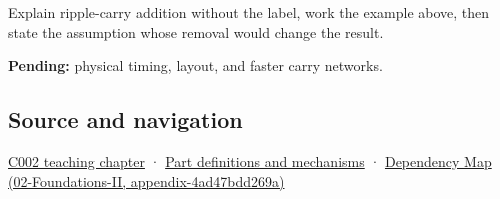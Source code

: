 Explain ripple-carry addition without the label, work the example above, then state the assumption whose removal would change the result.

\textbf{Pending:} physical timing, layout, and faster carry networks.

\subsection{Source and navigation}\label{source-and-navigation}

\href{Continuous\%20Notes/Computing\%20Foundations\%20-\%20From\%20Bits\%20to\%20C++\%20and\%20Systems\%20APIs\#Arithmetic\%20becomes\%20a\%20policy}{C002 teaching chapter} · \hyperref[appendix-fd090d982a15]{Part definitions and mechanisms} · \href{}{Dependency Map (02-Foundations-II, appendix-4ad47bdd269a)}
